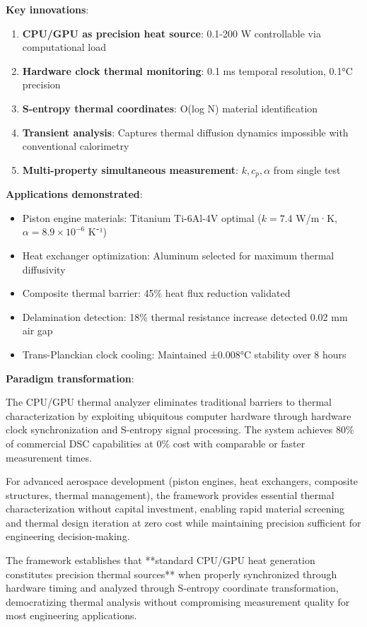 \documentclass[12pt,a4paper]{article}
\begin{document}
{{\textbf{Key innovations}:
\begin{enumerate}
\item \textbf{CPU/GPU as precision heat source}: 0.1-200 W controllable via computational load
\item \textbf{Hardware clock thermal monitoring}: 0.1 ms temporal resolution, 0.1°C precision
\item \textbf{S-entropy thermal coordinates}: O(log N) material identification
\item \textbf{Transient analysis}: Captures thermal diffusion dynamics impossible with conventional calorimetry
\item \textbf{Multi-property simultaneous measurement}: $k, c_p, \alpha$ from single test
\end{enumerate}

\textbf{Applications demonstrated}:
\begin{itemize}
\item Piston engine materials: Titanium Ti-6Al-4V optimal ($k = 7.4$ W/m·K, $\alpha = 8.9 \times 10^{-6}$ K⁻¹)
\item Heat exchanger optimization: Aluminum selected for maximum thermal diffusivity
\item Composite thermal barrier: 45\% heat flux reduction validated
\item Delamination detection: 18\% thermal resistance increase detected 0.02 mm air gap
\item Trans-Planckian clock cooling: Maintained ±0.008°C stability over 8 hours
\end{itemize}

\textbf{Paradigm transformation}:

The CPU/GPU thermal analyzer eliminates traditional barriers to thermal characterization by exploiting ubiquitous computer hardware through hardware clock synchronization and S-entropy signal processing. The system achieves 80\% of commercial DSC capabilities at 0\% cost with comparable or faster measurement times.

For advanced aerospace development (piston engines, heat exchangers, composite structures, thermal management), the framework provides essential thermal characterization without capital investment, enabling rapid material screening and thermal design iteration at zero cost while maintaining precision sufficient for engineering decision-making.

The framework establishes that **standard CPU/GPU heat generation constitutes precision thermal sources** when properly synchronized through hardware timing and analyzed through S-entropy coordinate transformation, democratizing thermal analysis without compromising measurement quality for most engineering applications.

}}
\end{document}
